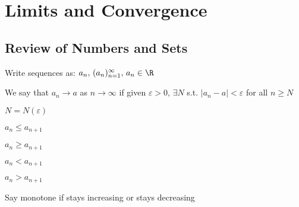 
\def\npart {IA}
\def\nterm {Lent}
\def\nyear {2022}
\def\nlecturer {Prof G. Paternain}
\def\ncourse {Analysis I}



\author{Based on lectures by \nlecturer \\\small Based on notes by Hasan Baig}

\newcommand{\br}[1]{\lbrack #1 \rbrack}
\newcommand{\e}{\varepsilon}
\newcommand{\la}{\lambda}
\newcommand{\m}{\mu}
\newcommand{\n}{\nu}
\newcommand{\de}{\delta}
\renewcommand{\P}{\mathbb{P}}
\newcommand{\cov}{\text{Cov}}
\newcommand{\corr}{\text{Corr}}
\newcommand{\im}{\text{Im}}
\newcommand{\re}{\text{Re}}
\newcommand{\sym}{\text{Sym}}
\newcommand{\power}{\mathbb{P}}
\newcommand{\tick}{\checkmark}
\newcommand{\indep}{\perp\!\!\!\perp}
\newcommand{\s}[2][i]{\sum\limits_{#1 = 1}^{#2}}


\maketitle
\tableofcontents

\newpage
\setcounter{section}{0}
\section{Limits and Convergence}
\subsection{Review of Numbers and Sets}
\begin{notation}
Write sequences as: $a_n,\,(a_n)_{n=1}^\infty,\, a_n \in \R$
\end{notation}
\begin{definition}
We say that $a_n \to a$ as $n \to \infty$ if given $\varepsilon > 0,\, \exists N$ s.t. $|a_n - a| < \varepsilon$ for all $n \geq N$
\begin{note}
$N = N(\varepsilon)$
\end{note}
\end{definition}
\begin{definition}
$a_n \leq a_{n+1}$
\end{definition}
\begin{definition}
$a_n \geq a_{n+1}$
\end{definition}
\begin{definition}
$a_n < a_{n+1}$
\end{definition}
\begin{definition}
$a_n > a_{n+1}$
\end{definition}
\begin{note}
Say monotone if stays increasing or stays decreasing
\end{note}
